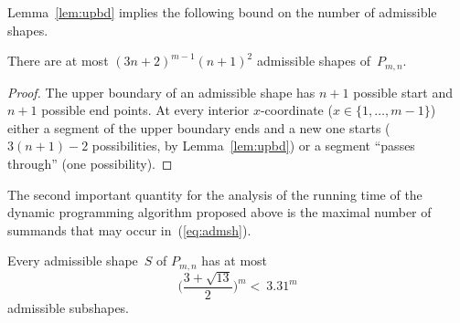 Lemma~\ref{lem:upbd} implies the following bound on the number of
admissible shapes. 

\begin{lemma}
  \label{lem:numadm}
  There are at most $(3n+2)^{m-1}(n+1)^2$ admissible shapes of~$P_{m,n}$.
\end{lemma}

\begin{proof}
  The upper boundary of an admissible shape has $n+1$ possible start
  and $n+1$ possible end points. At every interior $x$-coordinate
  ($x\in\{1,\dots,m-1\}$) either a segment of the upper boundary ends
  and a new one starts ($3(n+1)-2$ possibilities, by
  Lemma~\ref{lem:upbd}) or a segment ``passes through'' (one possibility).
\end{proof}

The second important quantity for the analysis of the running time of
the dynamic programming algorithm proposed above is the maximal number
of summands that may occur in~(\ref{eq:admsh}).

\begin{lemma}
  \label{lem:maxtria}
  Every admissible shape~$S$ of $P_{m,n}$ has at most 
  $$
  \Big(\frac{3+\sqrt{13}}{2}\Big)^m<\ 3.31^m
  $$
  admissible subshapes.
\end{lemma}


